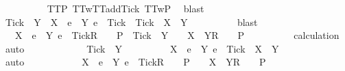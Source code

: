 \begin{isabellebody}
\ \ \ \ \ \ \ \ \isamarkupfalse%
\ TT{}{\isacharunderscore}P\ TT{}w{\isacharunderscore}TT{}{\isacharunderscore}add{\isacharunderscore}Tick\ TT{}w{\isacharunderscore}P\ \isamarkupfalse%
\ blast\isanewline
\ \ \ \ \ \ \isamarkupfalse%
\ \isamarkupfalse%
\ {\isachardoublequoteopen}Tick\ {\isasymin}\ Y\ {\isasymLongrightarrow}\ X\ {\isasymunion}\ {\isacharbraceleft}e\ {\isasymin}\ Y{\isachardot}\ e\ {\isasymnoteq}\ Tick{\isacharbraceright}\ {\isasymunion}\ {\isacharbraceleft}Tick{\isacharbraceright}\ {\isacharequal}\ X\ {\isasymunion}\ Y{\isachardoublequoteclose}\isanewline
\ \ \ \ \ \ \ \ \isamarkupfalse%
\ blast\isanewline
\ \ \ \ \ \ \isamarkupfalse%
\ \isamarkupfalse%
\ {\isachardoublequoteopen}{\isasymrho}\ {\isacharat}\ {\isacharbrackleft}X\ {\isasymunion}\ {\isacharbraceleft}e\ {\isasymin}\ Y{\isachardot}\ e\ {\isasymnoteq}\ Tick{\isacharbraceright}{\isacharbrackright}\isactrlsub R\ {\isacharhash}\ {\isasymsigma}\ {\isasymin}\ P\ {\isasymLongrightarrow}\ Tick\ {\isasymin}\ Y\ {\isasymLongrightarrow}\ {\isasymrho}\ {\isacharat}\ {\isacharbrackleft}X\ {\isasymunion}\ Y{\isacharbrackright}\isactrlsub R\ {\isacharhash}\ {\isasymsigma}\ {\isasymin}\ P{\isachardoublequoteclose}\isanewline
\ \ \ \ \ \ \ \ \isamarkupfalse%
\ calculation\ \isamarkupfalse%
\ auto\isanewline
\ \ \ \ \isamarkupfalse%
\isanewline
\ \ \ \ \ \ \isamarkupfalse%
\ {\isachardoublequoteopen}Tick\ {\isasymnotin}\ Y{\isachardoublequoteclose}\isanewline
\ \ \ \ \ \ \isamarkupfalse%
\ \isamarkupfalse%
\ {\isachardoublequoteopen}X\ {\isasymunion}\ {\isacharbraceleft}e\ {\isasymin}\ Y{\isachardot}\ e\ {\isasymnoteq}\ Tick{\isacharbraceright}\ {\isacharequal}\ X\ {\isasymunion}\ Y{\isachardoublequoteclose}\isanewline
\ \ \ \ \ \ \ \ \isamarkupfalse%
\ auto\isanewline
\ \ \ \ \ \ \isamarkupfalse%
\ \isamarkupfalse%
\ {\isachardoublequoteopen}{\isasymrho}\ {\isacharat}\ {\isacharbrackleft}X\ {\isasymunion}\ {\isacharbraceleft}e\ {\isasymin}\ Y{\isachardot}\ e\ {\isasymnoteq}\ Tick{\isacharbraceright}{\isacharbrackright}\isactrlsub R\ {\isacharhash}\ {\isasymsigma}\ {\isasymin}\ P\ {\isasymLongrightarrow}\ {\isasymrho}\ {\isacharat}\ {\isacharbrackleft}X\ {\isasymunion}\ Y{\isacharbrackright}\isactrlsub R\ {\isacharhash}\ {\isasymsigma}\ {\isasymin}\ P{\isachardoublequoteclose}\isanewline

\end{isabellebody}
